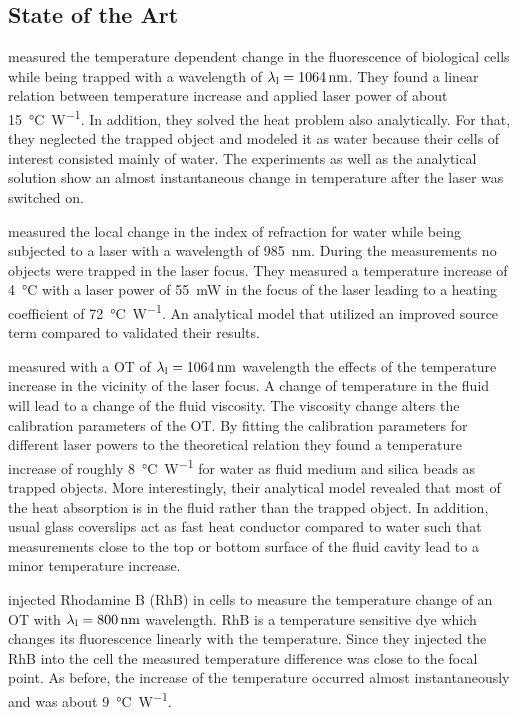 \subsection{State of the Art}\label{sec:TO-state}

 measured the temperature dependent change in the fluorescence 
of biological cells while being trapped with a wavelength of 
$\lal=\SI{1064}{\nm}$. They found a linear relation between temperature 
increase and applied laser power of about \SI{15}{\degreeCelsius\per\watt}. In 
addition, they solved the heat problem also analytically. For that, they 
neglected the trapped object and modeled it as water because their cells of 
interest consisted mainly of water. The experiments as well as the analytical 
solution show an almost instantaneous change in temperature after the laser was 
switched on.

 measured the local change in the index of refraction for 
water while being subjected to a laser with a wavelength of \SI{985}{\nm}. 
During the measurements no objects were trapped in the laser focus. They 
measured a temperature increase of \SI{4}{\degreeCelsius} with a laser power of 
\SI{55}{\milli\watt} in the focus of the laser leading to a heating coefficient 
of \SI{72}{\degreeCelsius\per\watt}. An analytical model that utilized an 
improved source term compared to \cite{Liu1995} validated their results.

 measured with a OT of $\lal=\SI{1064}{\nm}$ wavelength the 
effects of the temperature increase in the vicinity of the laser focus. A 
change of temperature in the fluid will lead to a change of the fluid 
viscosity. The viscosity change alters the calibration parameters of the OT. By 
fitting the calibration parameters for different laser powers to the 
theoretical relation they found a temperature increase of roughly 
\SI{8}{\degreeCelsius\per\watt} for water as fluid medium and silica beads as 
trapped objects. More interestingly, their analytical model revealed that most 
of the heat absorption is in the fluid rather than the trapped object. In 
addition, usual glass coverslips act as fast heat conductor compared to water 
such that measurements close to the top or bottom surface of the fluid cavity 
lead to a minor temperature increase.

 injected Rhodamine B (RhB) in cells to measure the 
temperature change of an OT with $\lal=\SI{800}{\nm}$ wavelength. RhB is a 
temperature sensitive dye which changes its fluorescence linearly with the 
temperature. Since they injected the RhB into the cell the measured 
temperature difference was close to the focal point. As before, the increase of 
the temperature occurred almost instantaneously and was about 
\SI{9}{\degreeCelsius\per\watt}.

